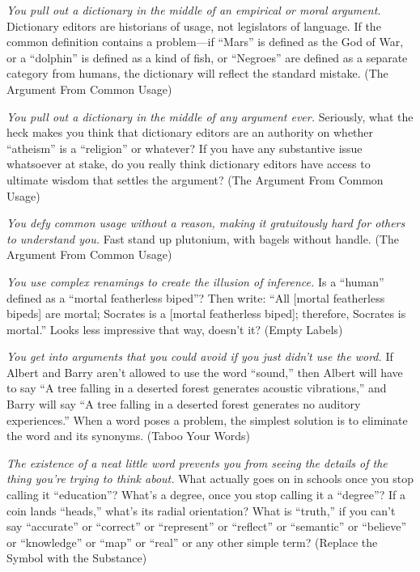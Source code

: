 {
 \textit{You pull out a dictionary in the middle of an empirical or
moral argument.} Dictionary editors are historians of usage, not
legislators of language. If the common definition contains a
problem---if ``Mars'' is defined as
the God of War, or a ``dolphin'' is
defined as a kind of fish, or
``Negroes'' are defined as a
separate category from humans, the dictionary will reflect the standard
mistake. (The Argument From Common Usage)}

{
 \textit{You pull out a dictionary in the middle of any argument
ever.} Seriously, what the heck makes you think that dictionary editors
are an authority on whether
``atheism'' is a
``religion'' or whatever? If you
have any substantive issue whatsoever at stake, do you really think
dictionary editors have access to ultimate wisdom that settles the
argument? (The Argument From Common Usage)}

{
 \textit{You defy common usage without a reason, making it
gratuitously hard for others to understand you.} Fast stand up
plutonium, with bagels without handle. (The Argument From Common
Usage)}

{
 \textit{You use complex renamings to create the illusion of
inference.} Is a ``human'' defined
as a ``mortal featherless biped''?
Then write: ``All [mortal featherless bipeds] are
mortal; Socrates is a [mortal featherless biped]; therefore, Socrates
is mortal.'' Looks less impressive that way,
doesn't it? (Empty Labels)}

{
 \textit{You get into arguments that you could avoid if you just
didn't use the word.} If Albert and Barry
aren't allowed to use the word
``sound,'' then Albert will have to
say ``A tree falling in a deserted forest generates
acoustic vibrations,'' and Barry will say
``A tree falling in a deserted forest generates no
auditory experiences.'' When a word poses a problem,
the simplest solution is to eliminate the word and its synonyms. (Taboo
Your Words)}

{
 \textit{The existence of a neat little word prevents you from
seeing the details of the thing you're trying to think
about.} What actually goes on in schools once you stop calling it
``education''?
What's a degree, once you stop calling it a
``degree''? If a coin lands
``heads,'' what's
its radial orientation? What is
``truth,'' if you
can't say
``accurate'' or
``correct'' or
``represent'' or
``reflect'' or
``semantic'' or
``believe'' or
``knowledge'' or
``map'' or
``real'' or any other simple term?
(Replace the Symbol with the Substance)}

